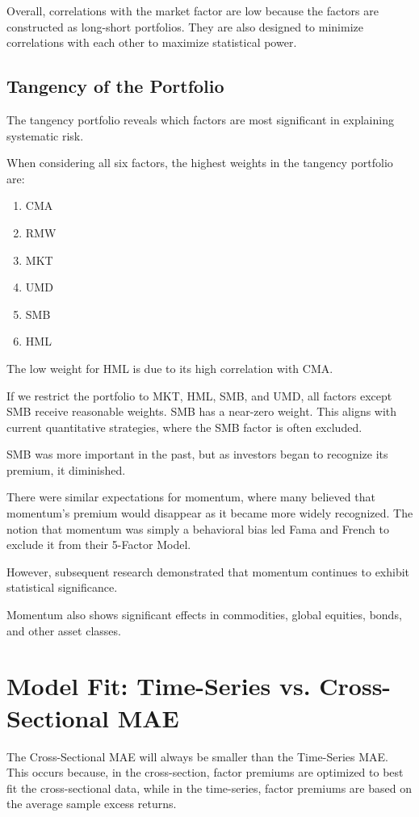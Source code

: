 \documentclass{article}
\begin{document}
Overall, correlations with the market factor are low because the factors are constructed as long-short portfolios. They are also designed to minimize correlations with each other to maximize statistical power.

\subsection{Tangency of the Portfolio}
The tangency portfolio reveals which factors are most significant in explaining systematic risk.

When considering all six factors, the highest weights in the tangency portfolio are:

\begin{enumerate}
    \item CMA
    \item RMW
    \item MKT
    \item UMD
    \item SMB
    \item HML
\end{enumerate}

The low weight for HML is due to its high correlation with CMA.

If we restrict the portfolio to MKT, HML, SMB, and UMD, all factors except SMB receive reasonable weights. SMB has a near-zero weight. This aligns with current quantitative strategies, where the SMB factor is often excluded.

SMB was more important in the past, but as investors began to recognize its premium, it diminished.

There were similar expectations for momentum, where many believed that momentum's premium would disappear as it became more widely recognized. The notion that momentum was simply a behavioral bias led Fama and French to exclude it from their 5-Factor Model.

However, subsequent research demonstrated that momentum continues to exhibit statistical significance.

Momentum also shows significant effects in commodities, global equities, bonds, and other asset classes.

\section{Model Fit: Time-Series vs. Cross-Sectional MAE}
The Cross-Sectional MAE will always be smaller than the Time-Series MAE. This occurs because, in the cross-section, factor premiums are optimized to best fit the cross-sectional data, while in the time-series, factor premiums are based on the average sample excess returns.
\end{document}
